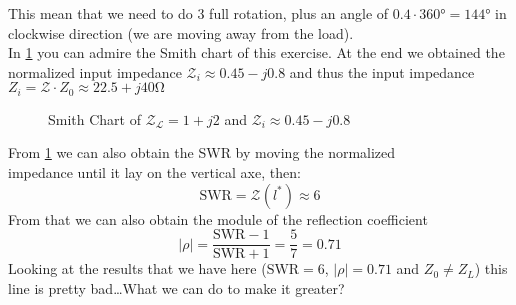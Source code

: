 This mean that we need to do 3 full rotation, plus an angle of $0.4 \cdot 360\si{\degree}=144\si{\degree}$ in clockwise direction (we are moving away from the load).\\
In \cref{fig:smith_es1} you can admire the Smith chart of this exercise. At the end we obtained the normalized input impedance $\mathcal{Z}_i\approx 0.45 -j0.8$ and thus the input impedance $Z_i=\mathcal{Z}\cdot Z_0\approx 22.5+j40\si{\ohm} $
\begin{figure}[H]
    \begin{center}
    \end{center}\caption{Smith Chart of $\mathcal{Z_L}=1+j2$ and $\mathcal{Z}_i \approx 0.45 -j0.8$}\label{fig:smith_es1}
\end{figure}
From \cref{fig:smith_es1} we can also obtain the SWR by moving the normalized \\impedance until it lay on the vertical axe, then:
\begin{equation*}
    \text{SWR}=\mathcal{Z}(l^*)\approx 6
\end{equation*}
From that we can also obtain the module of the reflection coefficient
\begin{equation*}
    |\rho|=\frac{\text{SWR}-1}{\text{SWR}+1}=\frac{5}{7}=0.71
\end{equation*}
Looking at the results that we have here ($\text{SWR}=6$, $|\rho|=0.71$ and $Z_0\neq Z_L$) this line is pretty bad\dots What we can do to make it greater?
